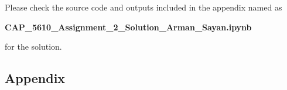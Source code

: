 \documentclass[12pt,letterpaper, onecolumn]{exam}
\begin{document}
\begin{questions}

    \begin{solution}

        Please check the source code and outputs included in the appendix named as

        \begin{center}
            \textbf{CAP\_5610\_Assignment\_2\_Solution\_Arman\_Sayan.ipynb}
        \end{center}
        
        for the solution.
    \end{solution}

    \pagebreak
    
\end{questions}

\begin{appendix}
    \centering
    \begin{flushleft}  
      \section{Appendix}
      
    \end{flushleft}
\end{appendix}
\end{document}
